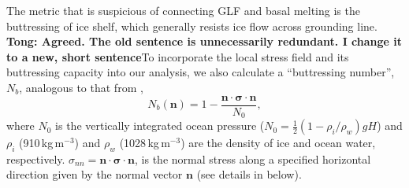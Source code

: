 \documentclass[tc, manuscript]{copernicus}
\begin{document}
The metric that is suspicious of connecting GLF and basal melting is the buttressing of ice shelf, which generally resists ice flow across grounding line.
\textbf{Tong: Agreed. The old sentence is unnecessarily redundant. I change it to a new, short sentence}To incorporate the local stress field and its buttressing capacity into our analysis, we also calculate a ``buttressing number'', $N_b$, analogous to that from \citet{furst2016},
\begin{equation}
N_b\left(\mathbf{n}\right)=1-\frac{\mathbf{n}\cdot\mathbf{\sigma}\cdot\mathbf{n}}{N_0},
\label{butN}
\end{equation}
where $N_0$ is the vertically integrated ocean pressure ($N_0=\frac{1}{2}\left(1-{\rho_i}/{\rho_w}\right)gH$) and $\rho_i$ (910\,kg\,m$^{-3}$) and $\rho_w$ (1028\,kg\,m$^{-3}$) are the density of ice and ocean water, respectively. $\sigma_{nn}=\mathbf{n}\cdot\mathbf{\sigma}\cdot\mathbf{n}$, is the normal stress along a specified horizontal direction given by the normal vector $\mathbf{n}$ (see details in below).

%
\end{document}
